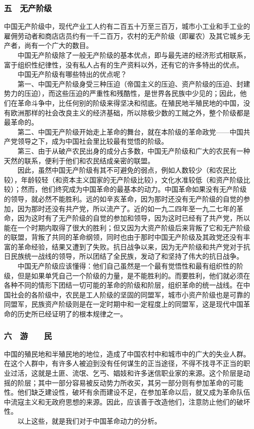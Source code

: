 \documentclass[cn,11pt,chinese]{elegantbook}
\def\myformat#1{\hfil\hfil #1}
\begin{document}
\subsubsection*{\myformat{五　无产阶级}}
中国无产阶级中，现代产业工人约有二百五十万至三百万，城市小工业和手工业的雇佣劳动者和商店店员约有一千二百万，农村的无产阶级（即雇农）及其它城乡无产者，尚有一个广大的数目。\\
　　中国无产阶级除了一般无产阶级的基本优点，即与最先进的经济形式相联系，富于组织性纪律性，没有私人占有的生产资料以外，还有它的许多特出的优点。\\
　　中国无产阶级有哪些特出的优点呢？\\
　　第一、中国无产阶级身受三种压迫（帝国主义的压迫、资产阶级的压迫、封建势力的压迫），而这些压迫的严重性和残酷性，是世界各民族中少见的；因此，他们在革命斗争中，比任何别的阶级来得坚决和彻底。在殖民地半殖民地的中国，没有欧洲那样的社会改良主义的经济基础，所以除极少数的工贼之外，整个阶级都是最革命的。\\
　　第二、中国无产阶级开始走上革命的舞台，就在本阶级的革命政党——中国共产党领导之下，成为中国社会里比较最有觉悟的阶级。\\
　　第三、由于从破产农民出身的成分占多数，中国无产阶级和广大的农民有一种天然的联系，便利于他们和农民结成亲密的联盟。\\
　　因此，虽然中国无产阶级有其不可避免的弱点，例如人数较少（和农民比较），年龄较轻（和资本主义国家的无产阶级比较），文化水准较低（和资产阶级比较）；然而，他们终究成为中国革命的最基本的动力。中国革命如果没有无产阶级的领导，就必然不能胜利。远的如辛亥革命，因为那时还没有无产阶级的自觉的参加，因为那时还没有共产党，所以流产了。近的如一九二四年至一九二七年的革命，因为这时有了无产阶级的自觉的参加和领导，因为这时已经有了共产党，所以能在一个时期内取得了很大的胜利；但又因为大资产阶级后来背叛了它和无产阶级的联盟，背叛了共同的革命纲领，同时也由于那时中国无产阶级及其政党还没有丰富的革命经验，结果又遭到了失败。抗日战争以来，因为无产阶级和共产党对于抗日民族统一战线的领导，所以团结了全民族，发动了和坚持了伟大的抗日战争。\\
　　中国无产阶级应该懂得：他们自己虽然是一个最有觉悟性和最有组织性的阶级，但是如果单凭自己一个阶级的力量，是不能胜利的。而要胜利，他们就必须在各种不同的情形下团结一切可能的革命的阶级和阶层，组织革命的统一战线。在中国社会的各阶级中，农民是工人阶级的坚固的同盟军，城市小资产阶级也是可靠的同盟军，民族资产阶级则是在一定时期中和一定程度上的同盟军，这是现代中国革命的历史所已经证明了的根本规律之一。\\
\subsubsection*{\myformat{六　游　　民}}
中国的殖民地和半殖民地的地位，造成了中国农村中和城市中的广大的失业人群。在这个人群中，有许多人被迫到没有任何谋生的正当途径，不得不找寻不正当的职业过活，这就是土匪、流氓、乞丐、娼妓和许多迷信职业家的来源。这个阶层是动摇的阶层；其中一部分容易被反动势力所收买，其另一部分则有参加革命的可能性。他们缺乏建设性，破坏有余而建设不足，在参加革命以后，就又成为革命队伍中流寇主义和无政府思想的来源。因此，应该善于改造他们，注意防止他们的破坏性。\\
　　以上这些，就是我们对于中国革命动力的分析。\\
\end{document}
